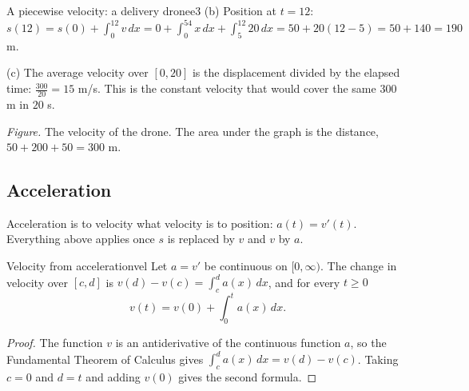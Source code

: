 \documentclass[11pt]{article}
\begin{document}
\begin{exmp}{A piecewise velocity: a delivery drone}{e3}
(b) Position at $t=12$: $s(12)=s(0)+\int_0^{12}v\,dx=0+\int_0^54x\,dx+\int_5^{12}20\,dx=50+20(12-5)=50+140=190$ m.

(c) The average velocity over $[0,20]$ is the displacement divided by the elapsed time: $\frac{300}{20}=15$ m/s. This is the constant velocity that would cover the same $300$ m in $20$ s.

\begin{center}
\par\small\emph{Figure.} The velocity of the drone. The area under the graph is the distance, $50+200+50=300$ m.
\end{center}
\end{exmp}

\subsection*{Acceleration}

Acceleration is to velocity what velocity is to position: $a(t)=v'(t)$. Everything above applies once $s$ is replaced by $v$ and $v$ by $a$.

\begin{thm}{Velocity from acceleration}{vel}
Let $a=v'$ be continuous on $[0,\infty)$. The change in velocity over $[c,d]$ is $v(d)-v(c)=\int_c^da(x)\,dx$, and for every $t\ge0$
\[
v(t)=v(0)+\int_0^ta(x)\,dx .
\]
\end{thm}
\begin{proof}
The function $v$ is an antiderivative of the continuous function $a$, so the Fundamental Theorem of Calculus gives $\int_c^da(x)\,dx=v(d)-v(c)$. Taking $c=0$ and $d=t$ and adding $v(0)$ gives the second formula.
\end{proof}
\end{document}
